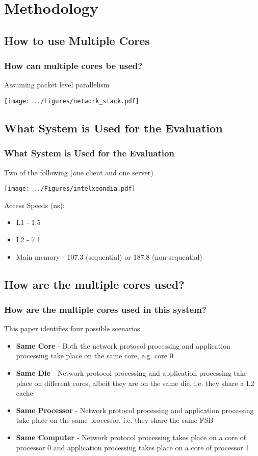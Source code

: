 \documentclass{beamer}
\begin{document}
\section{Methodology}

\subsection[Using Multiple Cores]{How to use Multiple Cores}

\begin{frame}
    \frametitle{How can multiple cores be used?}
    Assuming packet level parallelism
	\begin{center}
		\texttt{[image: ../Figures/network\_stack.pdf]}
	\end{center}
\end{frame}

\subsection[Using Multiple Cores]{What System is Used for the Evaluation}
\begin{frame}
    \frametitle{What System is Used for the Evaluation}
    Two of the following (one client and one server)
	\begin{center}
		\texttt{[image: ../Figures/intelxeondia.pdf]}
	\end{center}
	\begin{small}Access Speeds (ns): 
	\begin{itemize}
	\item L1 - 1.5
	\item L2 - 7.1
	\item Main memory - 107.3 (sequential) or 187.8 (non-sequential)
	\end{itemize}\end{small}
\end{frame}

\subsection[Using Multiple Cores]{How are the multiple cores used?}
\begin{frame}
    \frametitle{How are the multiple cores used in this system?}
    This paper identifies four possible scenarios
    \begin{itemize}
    	\item \textbf{Same Core} - Both the network protocol processing and application processing take place on the same core, e.g. core 0
		\item \textbf{Same Die} - Network protocol processing and application processing take place on different cores, albeit they are on the same die, i.e. they share a L2 cache
		\item \textbf{Same Processor} - Network protocol processing and application processing take place on the same processor, i.e. they share the same FSB
		\item \textbf{Same Computer} - Network protocol processing takes place on a core of processor 0 and application processing takes place on a core of processor 1
    \end{itemize}
\end{frame}
\end{document}
